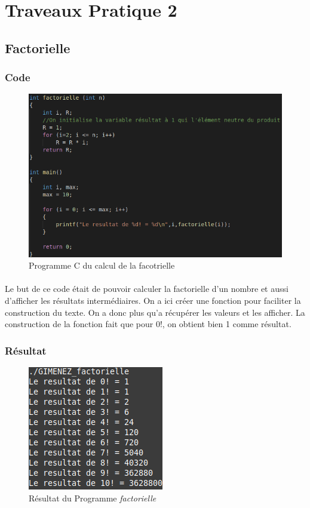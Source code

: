 \documentclass[10pt,a4paper]{article}
\begin{document}
\section{Traveaux Pratique 2}

\subsection{Factorielle}
\subsubsection{Code}
	\begin{figure}[h]
	\begin{center}
	\includegraphics[scale=.3]{images/factorielle_c}
	\end{center}
	\caption{Programme C du calcul de la facotrielle}
	\end{figure}
\paragraph{}
	Le but de ce code était de pouvoir calculer la factorielle d'un nombre et aussi d'afficher les résultats intermédiaires. 
	On a ici créer une fonction pour faciliter la construction du texte. On a donc plus qu'a récupérer les valeurs et les afficher.
	La construction de la fonction fait que pour 0!, on obtient bien 1 comme résultat.
\subsubsection{Résultat}
	\begin{figure}[h]
	\begin{center}
	\includegraphics[scale=.3]{images/factorielle_ex}
	\end{center}
	\caption{Résultat du Programme \emph{factorielle}}
	\end{figure}
\end{document}
